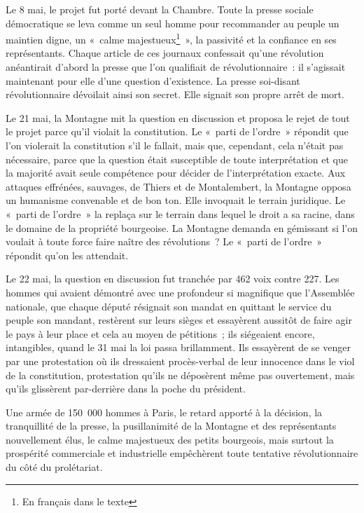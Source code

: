 \documentclass[french,twoside]{book} %
\begin{document}
Le 8 mai, le projet fut porté devant la Chambre. Toute la presse sociale démocratique se leva comme un seul homme pour recommander au peuple un maintien digne, un « calme majestueux\footnote{En français dans le texte} », la passivité et la confiance en ses représentants. Chaque article de ces journaux confessait qu’une révolution anéantirait d’abord la presse que l’on qualifiait de révolutionnaire : il s’agissait maintenant pour elle d’une question d’existence. La presse soi-disant révolutionnaire dévoilait ainsi son secret. Elle signait son propre arrêt de mort.\par
Le 21 mai, la Montagne mit la question en discussion et proposa le rejet de tout le projet parce qu’il violait la constitution. Le « parti de l’ordre » répondit que l’on violerait la constitution s’il le fallait, mais que, cependant, cela n’était pas nécessaire, parce que la question était susceptible de toute interprétation et que la majorité avait seule compétence pour décider de l’interprétation exacte. Aux attaques effrénées, sauvages, de Thiers et de Montalembert, la Montagne opposa un humanisme convenable et de bon ton. Elle invoquait le terrain juridique. Le « parti de l’ordre » la replaça sur le terrain dans lequel le droit a sa racine, dans le domaine de la propriété bourgeoise. La Montagne demanda en gémissant si l’on voulait à toute force faire naître des révolutions ? Le « parti de l’ordre » répondit qu’on les attendait.\par
Le 22 mai, la question en discussion fut tranchée par 462 voix contre 227. Les hommes qui avaient démontré avec une profondeur si magnifique que l’Assemblée nationale, que chaque député résignait son mandat en quittant le service du peuple son mandant, restèrent sur leurs sièges et essayèrent aussitôt de faire agir le pays à leur place et cela au moyen de pétitions ; ils siégeaient encore, intangibles, quand le 31 mai la loi passa brillamment. Ils essayèrent de se venger par une protestation où ils dressaient procès-verbal de leur innocence dans le viol de la constitution, protestation qu’ils ne déposèrent même pas ouvertement, mais qu’ils glissèrent par-derrière dans la poche du président.\par
Une armée de 150 000 hommes à Paris, le retard apporté à la décision, la tranquillité de la presse, la pusillanimité de la Montagne et des représentants nouvellement élus, le calme majestueux des petits bourgeois, mais surtout la prospérité commerciale et industrielle empêchèrent toute tentative révolutionnaire du côté du prolétariat.\par
\end{document}
